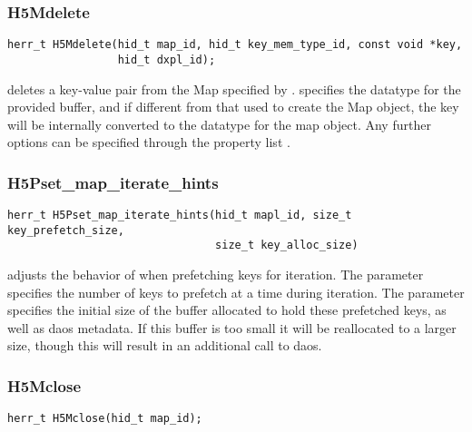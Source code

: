 \documentclass[../design_doc.tex]{subfiles}
\begin{document}
\subsubsection{H5Mdelete}

\begin{verbatim}
herr_t H5Mdelete(hid_t map_id, hid_t key_mem_type_id, const void *key,
                 hid_t dxpl_id);
\end{verbatim}

 deletes a key-value pair from the Map specified by .  specifies the datatype for the provided  buffer, and if different from that used to create the Map object, the key will be internally converted to the datatype for the map object. Any further options can be specified through the property list .

\subsubsection{H5Pset\_map\_iterate\_hints}

\begin{verbatim}
herr_t H5Pset_map_iterate_hints(hid_t mapl_id, size_t key_prefetch_size,
                                size_t key_alloc_size)
\end{verbatim}

 adjusts the behavior of  when prefetching keys for iteration. The  parameter specifies the number of keys to prefetch at a time during iteration. The  parameter specifies the initial size of the buffer allocated to hold these prefetched keys, as well as \acrshort{daos} metadata. If this buffer is too small it will be reallocated to a larger size, though this will result in an additional call to \acrshort{daos}.

\subsubsection{H5Mclose}

\begin{verbatim}
herr_t H5Mclose(hid_t map_id);
\end{verbatim}
\end{document}
